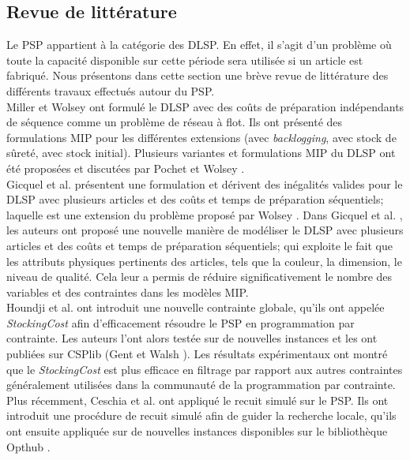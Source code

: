 	\subsection{Revue de littérature}
	Le PSP appartient à la catégorie des DLSP. En effet, il s'agit d'un problème où toute la capacité disponible sur cette période sera utilisée si un article est fabriqué. Nous présentons dans cette section une brève revue de littérature des différents travaux effectués autour du PSP. \\
	\hspace*{.5cm} Miller et Wolsey \cite{miller_wolsey} ont formulé le DLSP avec des coûts de préparation indépendants de séquence comme un problème de réseau à flot. Ils ont présenté des formulations MIP pour les différentes extensions (avec \emph{backlogging}, avec stock de sûreté, avec stock initial). Plusieurs variantes et formulations MIP du DLSP ont été proposées et discutées par Pochet et Wolsey \cite{pochet_wolsey}. \\
	\hspace*{.5cm} Gicquel et al. \cite{gicquel_minoux_dallery} présentent une formulation et dérivent des inégalités valides pour le DLSP avec plusieurs articles et des coûts et temps de préparation séquentiels; laquelle est une extension du problème proposé par Wolsey \cite{wolsey}. Dans Gicquel et al. \cite {gicquel_miegeville_minoux_dallery}, les auteurs ont proposé une nouvelle manière de modéliser le DLSP avec plusieurs articles et des coûts et temps de préparation séquentiels; qui exploite le fait que les attributs physiques pertinents des articles, tels que la couleur, la dimension, le niveau de qualité. Cela leur a permis de réduire significativement le nombre des variables et des contraintes dans les modèles MIP.\\
	\hspace*{.5cm}Houndji et al. \cite{hvr_stockingCost} ont introduit une nouvelle contrainte globale, qu'ils ont appelée \emph{StockingCost} afin d'efficacement résoudre le PSP en programmation par contrainte. Les auteurs l'ont alors testée sur de nouvelles instances et les ont publiées sur CSPlib (Gent et Walsh \cite{gent_walsh}). Les résultats expérimentaux ont montré que le \emph{StockingCost} est plus efficace en filtrage par rapport aux autres contraintes généralement utilisées dans la communauté de la programmation par contrainte. \\
	\hspace*{.5cm} Plus récemment, Ceschia et al. \cite{ceschia} ont appliqué le recuit simulé sur le PSP. Ils ont introduit une procédure de recuit simulé afin de guider la recherche locale, qu'ils ont ensuite appliquée sur de nouvelles instances disponibles sur le bibliothèque Opthub \cite{opthub}.
	 

